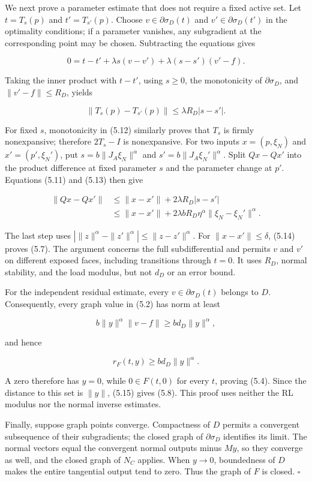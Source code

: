 \documentclass[11pt,a4paper]{article}
\theoremstyle{plain}
\theoremstyle{definition}
\theoremstyle{remark}
\begin{document}
We next prove a parameter estimate that does not require a fixed active
set. Let \(t=T_s(p)\) and \(t'=T_{s'}(p)\). Choose
\(v\in\partial\sigma_D(t)\) and \(v'\in\partial\sigma_D(t')\) in the
optimality conditions; if a parameter vanishes, any subgradient at the
corresponding point may be chosen. Subtracting the equations gives

\[
0=t-t'+\lambda s(v-v')+
\lambda(s-s')(v'-f).
\]

Taking the inner product with \(t-t'\), using \(s\ge0\), the
monotonicity of \(\partial\sigma_D\), and \(\|v'-f\|\le R_D\), yields

\[
\|T_s(p)-T_{s'}(p)\|
\le\lambda R_D|s-s'|.
\tag{5.13}
\]

For fixed \(s\), monotonicity in (5.12) similarly proves that \(T_s\) is
firmly nonexpansive; therefore \(2T_s-I\) is nonexpansive. For two
inputs \(x=(p,\xi_N)\) and \(x'=(p',\xi_N')\), put
\(s=b\|J_A\xi_N\|^\alpha\) and \(s'=b\|J_A\xi_N'\|^\alpha\). Split
\(Qx-Qx'\) into the product difference at fixed parameter \(s\) and the
parameter change at \(p'\). Equations (5.11) and (5.13) then give

\[
\begin{aligned}
\|Qx-Qx'\|
&\le\|x-x'\|+2\lambda R_D|s-s'|\\
&\le\|x-x'\|+
2\lambda bR_D\eta^\alpha\|\xi_N-\xi_N'\|^\alpha.
\end{aligned}
\tag{5.14}
\]

The last step uses \(|\|z\|^\alpha-\|z'\|^\alpha|\le\|z-z'\|^\alpha\).
For \(\|x-x'\|\le\delta\), (5.14) proves (5.7). The argument concerns
the full subdifferential and permits \(v\) and \(v'\) on different
exposed faces, including transitions through \(t=0\). It uses \(R_D\),
normal stability, and the load modulus, but not \(d_D\) or an error
bound.

For the independent residual estimate, every \(v\in\partial\sigma_D(t)\)
belongs to \(D\). Consequently, every graph value in (5.2) has norm at
least

\[
b\|y\|^\alpha\|v-f\|
\ge bd_D\|y\|^\alpha,
\]

and hence

\[
r_F(t,y)\ge bd_D\|y\|^\alpha.
\tag{5.15}
\]

A zero therefore has \(y=0\), while \(0\in F(t,0)\) for every \(t\),
proving (5.4). Since the distance to this set is \(\|y\|\), (5.15) gives
(5.8). This proof uses neither the RL modulus nor the normal inverse
estimates.

Finally, suppose graph points converge. Compactness of \(D\) permits a
convergent subsequence of their subgradients; the closed graph of
\(\partial\sigma_D\) identifies its limit. The normal vectors equal the
convergent normal outputs minus \(My\), so they converge as well, and
the closed graph of \(N_C\) applies. When \(y\to0\), boundedness of
\(D\) makes the entire tangential output tend to zero. Thus the graph of
\(F\) is closed. \(\square\)
\end{document}
